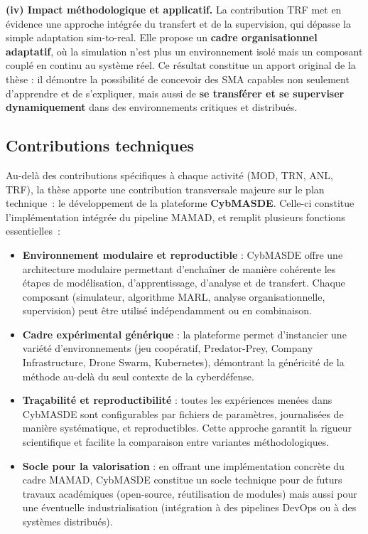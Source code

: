 \medskip
\noindent
\textbf{(iv) Impact méthodologique et applicatif.}
La contribution TRF met en évidence une approche intégrée du transfert et de la supervision, qui dépasse la simple adaptation sim-to-real.
Elle propose un \textbf{cadre organisationnel adaptatif}, où la simulation n’est plus un environnement isolé mais un composant couplé en continu au système réel.
Ce résultat constitue un apport original de la thèse : il démontre la possibilité de concevoir des SMA capables non seulement d’apprendre et de s’expliquer, mais aussi de \textbf{se transférer et se superviser dynamiquement} dans des environnements critiques et distribués.

\subsection*{Contributions techniques}

Au-delà des contributions spécifiques à chaque activité (MOD, TRN, ANL, TRF), la thèse apporte une contribution transversale majeure sur le plan technique~: le développement de la plateforme \textbf{CybMASDE}.
Celle-ci constitue l’implémentation intégrée du pipeline \ac{MAMAD}, et remplit plusieurs fonctions essentielles~:

\begin{itemize}
  \item \textbf{Environnement modulaire et reproductible} : CybMASDE offre une architecture modulaire permettant d’enchaîner de manière cohérente les étapes de modélisation, d’apprentissage, d’analyse et de transfert. Chaque composant (simulateur, algorithme MARL, analyse organisationnelle, supervision) peut être utilisé indépendamment ou en combinaison.
  \item \textbf{Cadre expérimental générique} : la plateforme permet d’instancier une variété d’environnements (jeu coopératif, Predator-Prey, Company Infrastructure, Drone Swarm, Kubernetes), démontrant la généricité de la méthode au-delà du seul contexte de la cyberdéfense.
  \item \textbf{Traçabilité et reproductibilité} : toutes les expériences menées dans CybMASDE sont configurables par fichiers de paramètres, journalisées de manière systématique, et reproductibles. Cette approche garantit la rigueur scientifique et facilite la comparaison entre variantes méthodologiques.
  \item \textbf{Socle pour la valorisation} : en offrant une implémentation concrète du cadre MAMAD, CybMASDE constitue un socle technique pour de futurs travaux académiques (open-source, réutilisation de modules) mais aussi pour une éventuelle industrialisation (intégration à des pipelines DevOps ou à des systèmes distribués).
\end{itemize}

